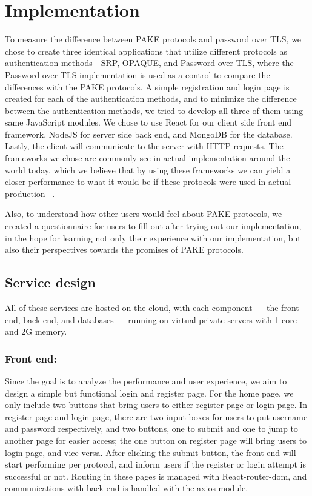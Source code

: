 \section{Implementation}
\label{sec:implementation}

To measure the difference between PAKE protocols and password over TLS, we chose to create three identical applications that utilize different protocols as authentication methods - SRP, OPAQUE, and Password over TLS, where the Password over TLS implementation is used as a control to compare the differences with the PAKE protocols.
A simple registration and login page is created for each of the authentication methods, and to minimize the difference between the authentication methods, we tried to develop all three of them using same JavaScript modules. 
We chose to use React for our client side front end framework, NodeJS for server side back end, and MongoDB for the database.
Lastly, the client will communicate to the server with HTTP requests.
The frameworks we chose are commonly see in actual implementation around the world today, which we believe that by using these frameworks we can yield a closer performance to what it would be if these protocols were used in actual production ~\cite{swacha2023evolution}.

Also, to understand how other users would feel about PAKE protocols, we created a questionnaire for users to fill out after trying out our implementation, in the hope for learning not only their experience with our implementation, but also their perspectives towards the promises of PAKE protocols.


\subsection{Service design}
All of these services are hosted on the cloud, with each component — the front end, back end, and databases — running on virtual private servers with 1 core and 2G memory.

\subsubsection{Front end:}
Since the goal is to analyze the performance and user experience, we aim to design a simple but functional login and register page. 
For the home page, we only include two buttons that bring users to either register page or login page.
In register page and login page, there are two input boxes for users to put username and password respectively, and two buttons, one to submit and one to jump to another page for easier access; the one button on register page will bring users to login page, and vice versa.
After clicking the submit button, the front end will start performing per protocol, and inform users if the register or login attempt is successful or not.
Routing in these pages is managed with React-router-dom, and communications with back end is handled with the axios module.

